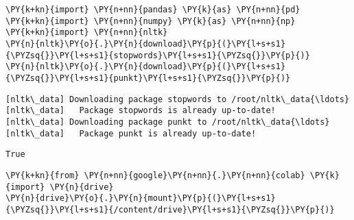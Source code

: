 \documentclass[11pt]{article}
\begin{document}
    
    \maketitle
    
    

    
    \begin{tcolorbox}[breakable, size=fbox, boxrule=1pt, pad at break*=1mm,colback=cellbackground, colframe=cellborder]
\begin{Verbatim}[commandchars=\\\{\}]
\PY{k+kn}{import} \PY{n+nn}{pandas} \PY{k}{as} \PY{n+nn}{pd}
\PY{k+kn}{import} \PY{n+nn}{numpy} \PY{k}{as} \PY{n+nn}{np}
\PY{k+kn}{import} \PY{n+nn}{nltk}
\PY{n}{nltk}\PY{o}{.}\PY{n}{download}\PY{p}{(}\PY{l+s+s1}{\PYZsq{}}\PY{l+s+s1}{stopwords}\PY{l+s+s1}{\PYZsq{}}\PY{p}{)}
\PY{n}{nltk}\PY{o}{.}\PY{n}{download}\PY{p}{(}\PY{l+s+s1}{\PYZsq{}}\PY{l+s+s1}{punkt}\PY{l+s+s1}{\PYZsq{}}\PY{p}{)}
\end{Verbatim}
\end{tcolorbox}

    \begin{Verbatim}[commandchars=\\\{\}]
[nltk\_data] Downloading package stopwords to /root/nltk\_data{\ldots}
[nltk\_data]   Package stopwords is already up-to-date!
[nltk\_data] Downloading package punkt to /root/nltk\_data{\ldots}
[nltk\_data]   Package punkt is already up-to-date!
    \end{Verbatim}

            \begin{tcolorbox}[breakable, size=fbox, boxrule=.5pt, pad at break*=1mm, opacityfill=0]
\begin{Verbatim}[commandchars=\\\{\}]
True
\end{Verbatim}
\end{tcolorbox}
        
    \begin{tcolorbox}[breakable, size=fbox, boxrule=1pt, pad at break*=1mm,colback=cellbackground, colframe=cellborder]
\begin{Verbatim}[commandchars=\\\{\}]
\PY{k+kn}{from} \PY{n+nn}{google}\PY{n+nn}{.}\PY{n+nn}{colab} \PY{k}{import} \PY{n}{drive}
\PY{n}{drive}\PY{o}{.}\PY{n}{mount}\PY{p}{(}\PY{l+s+s1}{\PYZsq{}}\PY{l+s+s1}{/content/drive}\PY{l+s+s1}{\PYZsq{}}\PY{p}{)}
\end{Verbatim}
\end{tcolorbox}
\end{document}
